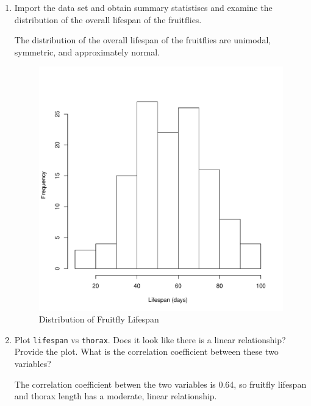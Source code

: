 \documentclass[12pt,letterpaper]{article}
\begin{document}
\begin{enumerate}
	
	\item
	Import the data set and obtain summary statistiscs and examine the distribution of the overall lifespan of the fruitflies.  
	
		 
	
	The distribution of the overall lifespan of the fruitflies are unimodal, symmetric, and approximately normal.
	
	\begin{figure} [h]
	\centering
	\includegraphics[width=0.7\linewidth]{fruitfly}
	\caption{Distribution of Fruitfly Lifespan}
	\label{fig:graph2}
\end{figure}

\newpage
	\item
	Plot \texttt{lifespan} vs \texttt{thorax}. Does it look like there is a linear relationship? Provide the plot. What is the correlation coefficient between these two variables?
					 
	
	The correlation coefficient betwen the two variables is 0.64, so fruitfly lifespan and thorax length has a moderate, linear relationship.
	

\end{enumerate}
\end{document}
